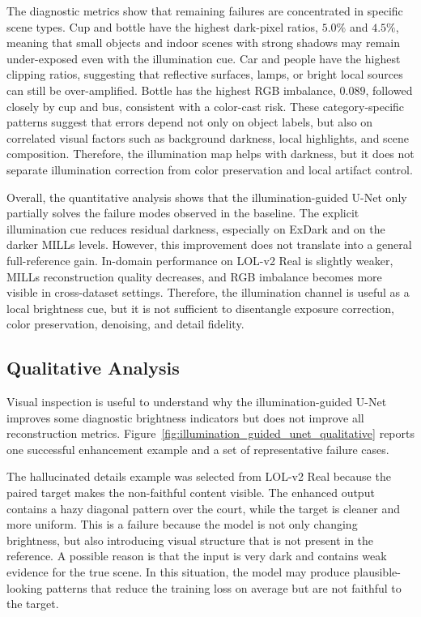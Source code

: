 The diagnostic metrics show that remaining failures are concentrated in specific scene types. Cup and bottle have the highest dark-pixel ratios, $5.0\%$ and $4.5\%$, meaning that small objects and indoor scenes with strong shadows may remain under-exposed even with the illumination cue. Car and people have the highest clipping ratios, suggesting that reflective surfaces, lamps, or bright local sources can still be over-amplified. Bottle has the highest RGB imbalance, $0.089$, followed closely by cup and bus, consistent with a color-cast risk. These category-specific patterns suggest that errors depend not only on object labels, but also on correlated visual factors such as background darkness, local highlights, and scene composition. Therefore, the illumination map helps with darkness, but it does not separate illumination correction from color preservation and local artifact control.

Overall, the quantitative analysis shows that the illumination-guided U-Net only partially solves the failure modes observed in the baseline. The explicit illumination cue reduces residual darkness, especially on ExDark and on the darker MILLs levels. However, this improvement does not translate into a general full-reference gain. In-domain performance on LOL-v2 Real is slightly weaker, MILLs reconstruction quality decreases, and RGB imbalance becomes more visible in cross-dataset settings. Therefore, the illumination channel is useful as a local brightness cue, but it is not sufficient to disentangle exposure correction, color preservation, denoising, and detail fidelity.

\subsection{Qualitative Analysis}

Visual inspection is useful to understand why the illumination-guided U-Net improves some diagnostic brightness indicators but does not improve all reconstruction metrics. Figure~\ref{fig:illumination_guided_unet_qualitative} reports one successful enhancement example and a set of representative failure cases.



The hallucinated details example was selected from LOL-v2 Real because the paired target makes the non-faithful content visible. The enhanced output contains a hazy diagonal pattern over the court, while the target is cleaner and more uniform. This is a failure because the model is not only changing brightness, but also introducing visual structure that is not present in the reference. A possible reason is that the input is very dark and contains weak evidence for the true scene. In this situation, the model may produce plausible-looking patterns that reduce the training loss on average but are not faithful to the target.

